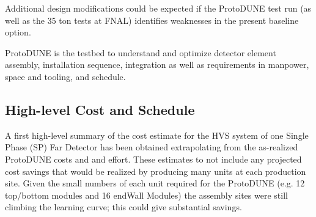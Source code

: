 Additional design modifications could be expected if the ProtoDUNE test run (as well as the 35 ton tests at FNAL) identifies weaknesses in the present baseline option.


ProtoDUNE is the testbed to understand and optimize detector element assembly, installation sequence, integration as well as requirements in manpower, space and tooling, and schedule. 



%
%
%
\subsection{High-level Cost and Schedule}
\label{sec:fdsp-hv-org-cs}

A first high-level summary of the cost estimate for the HVS system of one Single Phase (SP) Far Detector has been obtained extrapolating from the as-realized ProtoDUNE costs and and effort. These estimates to not include any projected cost savings that would be realized by producing many units at each production site. Given the small numbers of each unit required for the ProtoDUNE (e.g. 12 top/bottom modules and 16 endWall Modules) the assembly sites were still climbing the learning curve; this could give substantial savings. 

